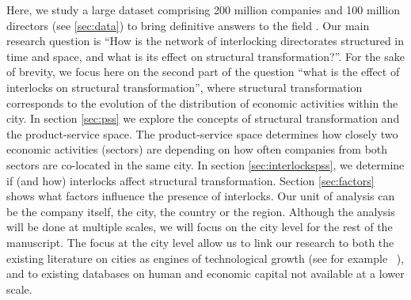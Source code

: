 Here, we study a large dataset comprising 200 million companies and 100 million directors (see \ref{sec:data}) to bring definitive answers to the field .
Our main research question is ``How is the network of interlocking directorates structured in time and space, and what is its effect on structural transformation?''.
For the sake of brevity, we focus here on the second part of the question ``what is the effect of interlocks on structural transformation'',
where structural transformation corresponds to the evolution of the distribution of economic activities within the city.
In section \ref{sec:pss} we explore the concepts of structural transformation and the product-service space.
The product-service space determines how closely two economic activities (sectors) are depending on how often companies from both sectors are co-located in the same city.
In section \ref{sec:interlockspss}, we determine if (and how) interlocks affect structural transformation.
Section \ref{sec:factors} shows what factors influence the presence of interlocks.
Our unit of analysis can be the company itself, the city, the country or the region. 
Although the analysis will be done at multiple scales,
we will focus on the city level for the rest of the manuscript.
The focus at the city level allow us to link our research to both the existing literature on cities as engines of technological growth (see for example ~\citep{Belderbos2014}),
and to existing databases on human and economic capital not available at a lower scale.


